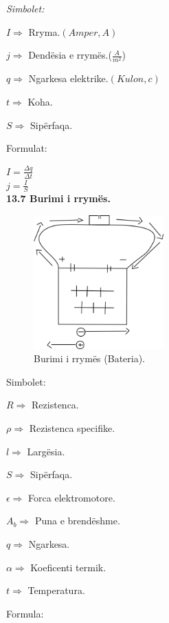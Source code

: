 \documentclass[twocolumn]{article}
\begin{document}
	\begin{center}
		\textit{Simbolet:}
	\end{center}
	
	$I \Rightarrow $ Rryma.$(Amper,A)$
	
	$j \Rightarrow $ Dendësia e rrymës.($\frac{A}{m^2}$)
	
	$q \Rightarrow$ Ngarkesa elektrike.$(Kulon,c)$
	
	$t \Rightarrow $ Koha. 
	
	$S \Rightarrow $ Sipërfaqa.
	\begin{center}
		Formulat:
	\end{center}
	
	$I=\frac{\Delta q}{\Delta t}$\\
	
	
	$j=\frac{I}{S}$\\
	
	
	\textbf{13.7 Burimi i rrymës.}
	\begin{figure}[h]
		\includegraphics[width=50mm]{Imazhet/bateria.png}
		\caption{Burimi i rrymës (Bateria).}
		\label{fig:boat1}
	\end{figure}
	
	\begin{center}
		Simbolet:
	\end{center}
	
	$R \Rightarrow $ Rezistenca.
	
	$\rho \Rightarrow$ Rezistenca specifike.
	
	$l \Rightarrow $ Largësia.
	
	$S \Rightarrow $ Sipërfaqa.
	
	$\epsilon \Rightarrow $ Forca elektromotore.
	
	$A_b \Rightarrow$ Puna e brendëshme.
	
	$q \Rightarrow $ Ngarkesa.
	
	$\alpha \Rightarrow $ Koeficenti termik.
	
	$t \Rightarrow $ Temperatura.
	
	\begin{center}
		Formula:
	\end{center}
	
\end{document}
